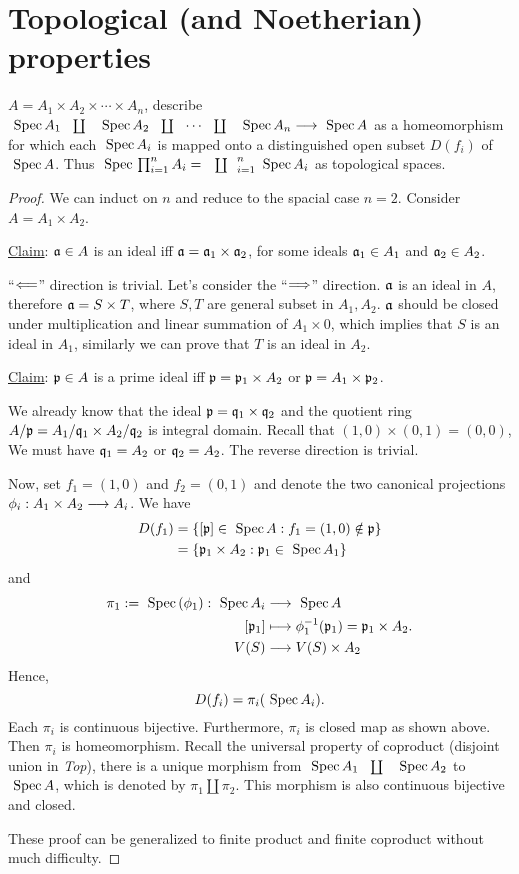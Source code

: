 \section{Topological (and Noetherian) properties}
\begin{exr}\label{exr:nonconnected_scheme}
$A = A_1 \times A_2 \times\cdots \times A_n$, describe $
\spec A_1\coprod \spec A_2\coprod \cdots \coprod\spec A_n\lrta \spec A$ as a homeomorphism for which each $\text{ Spec\,} A_i $ is mapped onto a distinguished open subset $D(f_i)$ of $\text{ Spec\,} A$. Thus $\spec \prod^n_{i=1}A_i=\coprod^n_{i=1}\spec A_i$ as topological spaces.
\end{exr}
\begin{proof}
We can induct on $n$ and reduce to the spacial case $n=2$. Consider $A=A_1\times A_2$. 

\underline{Claim}: ${\mathfrak a}\in A$ is an ideal iff ${\mathfrak a}={\mathfrak a}_1\times {\mathfrak a}_2$, for some ideals ${\mathfrak a}_1\in A_1$ and ${\mathfrak a}_2\in A_2$.

``$\Longleftarrow$'' direction is trivial. Let's consider the ``$\Longrightarrow$'' direction. ${\mathfrak a}$ is an ideal in $A$, therefore ${\mathfrak a}=S\times T$, where $S,T$ are general subset in $A_1,A_2$. ${\mathfrak a}$ should be closed under multiplication and linear summation of $A_1\times 0$, which implies that $S$ is an ideal in $A_1$, similarly we can prove that $T$ is an ideal in $A_2$.

\underline{Claim}: ${\mathfrak p}\in A$ is a prime ideal iff ${\mathfrak p}={\mathfrak p}_1\times A_2$ or ${\mathfrak p}=A_1\times {\mathfrak p}_2$.

We already know that the ideal ${\mathfrak p}=\mathfrak q_1\times \mathfrak q_2$ and the quotient ring $A/{\mathfrak p}=A_1/\mathfrak q_1\times A_2/\mathfrak q_2$ is integral domain. Recall that $(1,0)\times (0,1)=(0,0)$, We must have $\mathfrak q_1=A_2$ or $\mathfrak q_2=A_2$. The reverse direction is trivial.

Now, set $f_1=(1,0)$ and $f_2=(0,1)$ and denote the two canonical projections $\phi_i:A_1\times A_2\longrightarrow A_i$. We have
$$
\begin{aligned}
D(f_1)&=\{[{\mathfrak p}]\in \text{ Spec\,} A: f_1=(1,0)\notin{\mathfrak p}\}\\
&=\{{\mathfrak p}_1\times A_2:{\mathfrak p}_1\in \text{ Spec\,} A_1\}
\end{aligned}
$$ 
and 
$$
\begin{aligned}
\pi_1:=\spec(\phi_1):\spec A_i&\lrta \spec A\\
[\scp_1]&\longmapsto \phi_1^{-1}(\scp_1)=\scp_1\times A_2.\\
V(S)&\lrta V(S)\times A_2
\end{aligned}
$$
Hence,
$$
D(f_i)=\pi_i(\text{ Spec\,} A_i).
$$
Each $\pi_i$ is continuous bijective. Furthermore, $\pi_i$ is closed map as shown above. Then $\pi_i$ is homeomorphism. 
Recall the universal property of coproduct (disjoint union in \textit{Top}), there is a unique morphism from $\spec A_1\coprod\spec A_2$ to $\text{ Spec\,} A$, which is denoted by $\pi_1\coprod \pi_2$. This morphism is also continuous bijective and closed.

These proof can be generalized to finite product and finite coproduct without much difficulty.
\end{proof}
